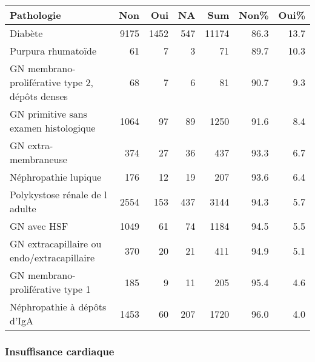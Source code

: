 \documentclass[11pt,a4paper]{article}\usepackage[]{graphicx}\usepackage[]{color}
\begin{document}
\begin{table}[H]
\centering
\begin{tabular}{lrrrrrr}
  \hline
Pathologie & Non & Oui & NA & Sum & Non\% & Oui\% \\ 
  \hline
Diabète & 9175 & 1452 & 547 & 11174 & 86.3 & 13.7 \\ 
  Purpura rhumatoïde & 61 &  7 &  3 & 71 & 89.7 & 10.3 \\ 
  GN membrano-proliférative type 2, dépôts denses & 68 &  7 &  6 & 81 & 90.7 & 9.3 \\ 
  GN primitive sans examen histologique & 1064 & 97 & 89 & 1250 & 91.6 & 8.4 \\ 
  GN extra-membraneuse & 374 & 27 & 36 & 437 & 93.3 & 6.7 \\ 
  Néphropathie lupique & 176 & 12 & 19 & 207 & 93.6 & 6.4 \\ 
  Polykystose rénale de l adulte & 2554 & 153 & 437 & 3144 & 94.3 & 5.7 \\ 
  GN avec HSF & 1049 & 61 & 74 & 1184 & 94.5 & 5.5 \\ 
  GN extracapillaire ou endo/extracapillaire & 370 & 20 & 21 & 411 & 94.9 & 5.1 \\ 
  GN membrano-proliférative type 1 & 185 &  9 & 11 & 205 & 95.4 & 4.6 \\ 
  Néphropathie à dépôts d'IgA & 1453 & 60 & 207 & 1720 & 96.0 & 4.0 \\ 
   \hline
\end{tabular}
\end{table}


\subsubsection*{Insuffisance cardiaque}
\end{document}
